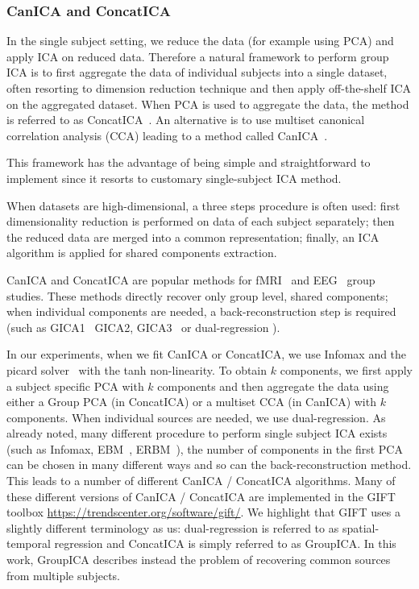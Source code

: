 \subsubsection{CanICA and ConcatICA}
\label{sec:canicaandconcatica}
In the single subject setting, we reduce the data (for example using PCA) and apply ICA on
reduced data. Therefore a natural framework to perform group ICA is to first aggregate the
data of individual subjects into a single dataset, often resorting to dimension
reduction technique and then apply off-the-shelf ICA on the aggregated dataset.
When PCA is used to aggregate the data, the method is referred to as
ConcatICA~\cite{calhoun2001method}. An alternative is to use multiset canonical
correlation analysis (CCA) leading to a method called CanICA~\cite{varoquaux2009canica}.

This framework has the advantage of being simple and
straightforward to implement since it resorts to customary single-subject
ICA method.

When datasets are high-dimensional, a three steps procedure is often used: first
dimensionality reduction is performed on data of each subject  separately; then
the reduced data are merged into a common representation; finally, an ICA
algorithm is applied for shared components extraction.

CanICA and ConcatICA are popular methods for fMRI~\cite{calhoun2009review} and
EEG~\cite{eichele2011eegift} group studies. These methods directly recover only
group level, shared components; when individual components are needed, a back-reconstruction step is required (such as GICA1~\cite{calhoun2001method} GICA2, GICA3~\cite{erhardt2011comparison} or dual-regression \cite{beckmann2009group}).

In our experiments, when we fit CanICA or ConcatICA, we use Infomax and the
  picard solver~\cite{ablin2018faster} with the tanh non-linearity. To obtain
  $k$ components, we first apply a subject specific PCA with $k$ components and
  then aggregate the data using either a Group PCA (in ConcatICA) or a multiset CCA (in
  CanICA) with $k$ components.
  When individual sources are needed, we use dual-regression.
  As already noted, many different procedure to perform single subject ICA exists (such as Infomax, EBM~\cite{li2010blind}, ERBM~\cite{li2010independent}), the number of components in the first PCA can be chosen in many different ways and so can the back-reconstruction method.
  This leads to a number of different CanICA / ConcatICA algorithms. Many of
  these different versions of CanICA / ConcatICA are implemented in the GIFT toolbox
  \url{https://trendscenter.org/software/gift/}.
  We highlight that GIFT uses a slightly different terminology as us: dual-regression is referred to as
  spatial-temporal regression and ConcatICA is simply referred to as GroupICA. In this work, GroupICA describes instead the problem of recovering common sources from multiple subjects.

